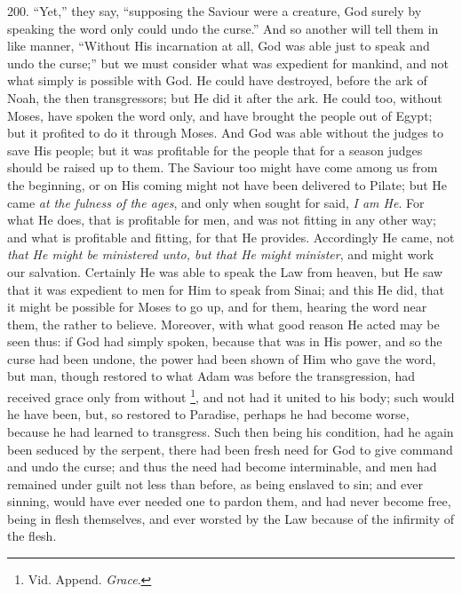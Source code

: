 200. ``Yet,'' they say, ``supposing
the Saviour were a creature, God surely by speaking the word only
could undo the curse.'' And so another will tell them in like manner, ``Without
His incarnation at all, God was able just to speak and undo the curse;''
but we must consider what was expedient for mankind, and not what
simply is possible with God. He could have destroyed, before the ark
of Noah, the then transgressors; but He did it after the ark. He could
too, without Moses, have spoken the word only, and have brought the
people out of Egypt; but it profited to do it through Moses.
And God was able without the judges to save His people; but it was
profitable for the people that for a season judges should be
raised up to them. The Saviour too might have come among us from the
beginning, or on His coming might not have been delivered to Pilate;
but He came \emph{at the fulness of the ages}, and only when sought
for said, \emph{I am He}. For what He does, that is profitable for
men, and was not fitting in any other way; and what is profitable and
fitting, for that He provides. Accordingly He came, not \emph{that He
might be ministered unto, but that He might minister}, and might
work our salvation. Certainly He was able to speak the Law from
heaven, but He saw that it was expedient to men for Him to speak from
Sinai; and this He did, that it might be possible for Moses to go up,
and for them, hearing the word near them, the rather to believe.
Moreover, with what good reason He acted may be seen thus: if God had
simply spoken, because that was in His power, and so the curse had
been undone, the power had been shown of Him who gave the word, but
man, though restored to what Adam was before the transgression, had
received grace only from without \footnote{Vid. Append. \emph{Grace}.}, and not had it united to his body; such would he have been,
but, so restored to Paradise, perhaps he had become worse, because he
had learned to transgress. Such then being his condition, had he again
been seduced by the serpent, there had been fresh need for God to give
command and undo the curse; and thus the need had become interminable,
and men had remained under guilt not less than before, as being
enslaved to sin; and ever sinning, would have ever needed one to
pardon them, and had never become free, being in flesh themselves, and
ever worsted by the Law because of the infirmity of the flesh.

